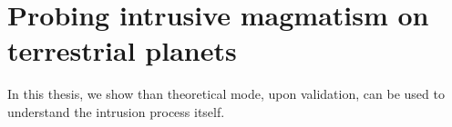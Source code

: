 \section{Probing intrusive magmatism on terrestrial planets}
\label{sec:elast-plat-grav}

In this thesis, we show than theoretical mode, upon validation, can be
used to understand the intrusion process itself.




